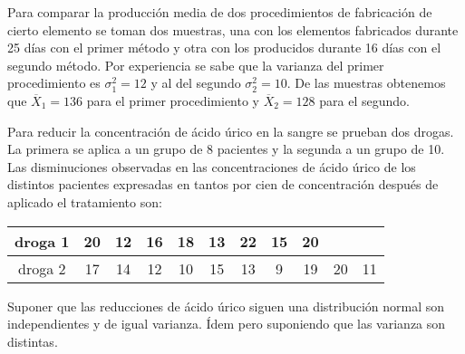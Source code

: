 \documentclass[12pt]{article}
\begin{document}
\begin{prob}
Para comparar la producción  media de dos procedimientos de fabricación de cierto elemento
se toman dos muestras, una con los elementos fabricados durante 25 días con el primer
método y otra con los producidos durante 16 días con el segundo método. Por experiencia se
sabe que la varianza del primer procedimiento es $\sigma_{1}^2=12$ y al del segundo
$\sigma_{2}^2=10$. De las muestras obtenemos que $\overline{X}_{1}=136$ para el primer
procedimiento y $\overline{X}_{2}=128$ para el segundo. 
\end{prob}


\begin{prob}
Para reducir la concentración de ácido úrico en la sangre se prueban dos drogas. La primera
se aplica a un grupo de 8 pacientes y la segunda a un grupo de 10. Las disminuciones
observadas en las concentraciones de ácido úrico de los distintos pacientes expresadas en
tantos por cien de concentración después de aplicado el tratamiento son:

\begin{center}
\begin{tabular}{|c|c|c|c|c|c|c|c|c|c|c|}
droga 1 & 20 & 12 & 16 & 18 & 13 & 22 & 15 & 20\\ \hline droga 2 & 17 & 14 & 12 & 10 & 15 &
13 & 9 & 19 & 20 & 11
\end{tabular}
\end{center}

 Suponer que las reducciones de ácido úrico siguen una
distribución normal son independientes y de igual varianza. 
Ídem pero suponiendo que las varianza son distintas.%
\end{prob}
\end{document}
